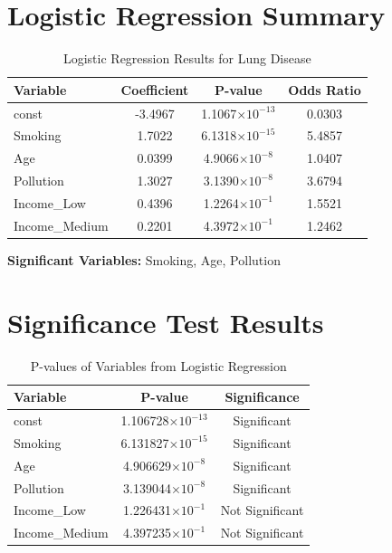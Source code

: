 \documentclass[12pt,a4paper]{report}
\begin{document}
\section*{Logistic Regression Summary}

\begin{table}[h!]
\centering
\caption{Logistic Regression Results for Lung Disease}
\begin{tabular}{lccc}
\hline
\textbf{Variable} & \textbf{Coefficient} & \textbf{P-value} & \textbf{Odds Ratio} \\
\hline
const         & -3.4967 & 1.1067$\times10^{-13}$ & 0.0303 \\
Smoking       &  1.7022 & 6.1318$\times10^{-15}$ & 5.4857 \\
Age           &  0.0399 & 4.9066$\times10^{-8}$  & 1.0407 \\
Pollution     &  1.3027 & 3.1390$\times10^{-8}$  & 3.6794 \\
Income\_Low   &  0.4396 & 1.2264$\times10^{-1}$  & 1.5521 \\
Income\_Medium&  0.2201 & 4.3972$\times10^{-1}$  & 1.2462 \\
\hline
\end{tabular}
\end{table}

\vspace{6pt}
\noindent
\textbf{Significant Variables:} Smoking, Age, Pollution
\section*{Significance Test Results}

\begin{table}[h!]
\centering
\caption{P-values of Variables from Logistic Regression}
\begin{tabular}{lcc}
\hline
\textbf{Variable} & \textbf{P-value} & \textbf{Significance} \\
\hline
const         & 1.106728$\times10^{-13}$ & Significant \\
Smoking       & 6.131827$\times10^{-15}$ & Significant \\
Age           & 4.906629$\times10^{-8}$  & Significant \\
Pollution     & 3.139044$\times10^{-8}$  & Significant \\
Income\_Low   & 1.226431$\times10^{-1}$  & Not Significant \\
Income\_Medium& 4.397235$\times10^{-1}$  & Not Significant \\
\hline
\end{tabular}
\end{table}
\end{document}
